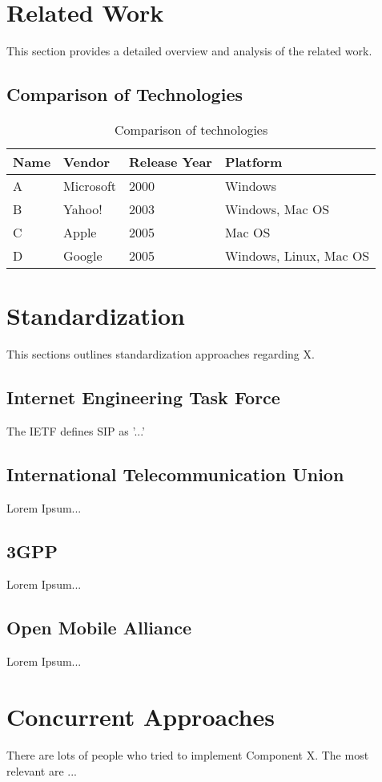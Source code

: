 \section{Related Work \label{sec:tech}}

This section provides a detailed overview and analysis of the related work. 



\subsection{Comparison of Technologies\label{sec:comp}}

\begin{table}[htb]
\centering
\begin{tabular}[t]{|l|l|l|l|}
\hline
Name & Vendor & Release Year & Platform \\
\hline
\hline
A & Microsoft & 2000 & Windows \\
\hline
B & Yahoo! & 2003 & Windows, Mac OS \\
\hline
C & Apple & 2005 & Mac OS \\
\hline
D & Google & 2005 & Windows, Linux, Mac OS \\
\hline
\end{tabular}
\caption{Comparison of technologies}
\label{tab:enghistory}
\end{table}

\section{Standardization \label{sec:standard}}

This sections outlines standardization approaches regarding X.

\subsection{Internet Engineering Task Force\label{sec:ietf}}

The IETF defines SIP as '...' \cite{rfcsip}

\subsection{International Telecommunication Union\label{sec:itu}}

Lorem Ipsum...

\subsection{3GPP\label{sec:3gpp}}

Lorem Ipsum...

\subsection{Open Mobile Alliance\label{sec:oma}}

Lorem Ipsum...

\section{Concurrent Approaches \label{sec:summ}}

There are lots of people who tried to implement Component X. The most relevant are ...